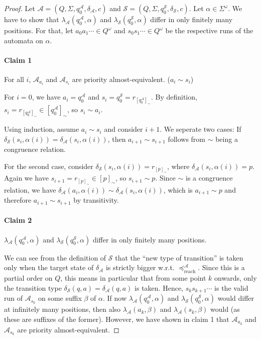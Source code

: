 \begin{proof}
	Let $\mathcal{A} = (Q, \Sigma, q_0^\mathcal{A}, \delta_\mathcal{A}, c)$ and $\mathcal{S} = (Q, \Sigma, q_0^\mathcal{S}, \delta_\mathcal{S}, c)$. Let $\alpha \in \Sigma^\omega$. We have to show that $\lambda_\mathcal{A}(q_0^\mathcal{A}, \alpha)$ and $\lambda_\mathcal{S}(q_0^\mathcal{S}, \alpha)$ differ in only finitely many positions. For that, let $a_0 a_1 \cdots \in Q^\omega$ and $s_0 s_1 \cdots \in Q^\omega$ be the respective runs of the automata on $\alpha$.
	
	\paragraph{Claim 1} For all $i$, $\mathcal{A}_{a_i}$ and $\mathcal{A}_{s_i}$ are priority almost-equivalent. ($a_i \sim s_i$)
	
	For $i = 0$, we have $a_i = q_0^\mathcal{A}$ and $s_i = q_0^\mathcal{S} = r_{[q_0^\mathcal{A}]_\sim}$. By definition, $s_i = r_{[q_0^\mathcal{A}]_\sim} \in [q_0^\mathcal{A}]_\sim$, so $s_i \sim a_i$.
	
	Using induction, assume $a_i \sim s_i$ and consider $i+1$. We seperate two cases: If $\delta_\mathcal{S}(s_i, \alpha(i)) = \delta_\mathcal{A}(s_i, \alpha(i))$, then $a_{i+1} \sim s_{i+1}$ follows from $\sim$ being a congruence relation.
	
	For the second case, consider $\delta_\mathcal{S}(s_i, \alpha(i)) = r_{[p]_\sim}$, where $\delta_\mathcal{A}(s_i, \alpha(i)) = p$. Again we have $s_{i+1} = r_{[p]_\sim} \in [p]_\sim$, so $s_{i+1} \sim p$. Since $\sim$ is a congruence relation, we have $\delta_\mathcal{A}(a_i, \alpha(i)) \sim \delta_\mathcal{A}(s_i, \alpha(i))$, which is $a_{i+1} \sim p$ and therefore $a_{i+1} \sim s_{i+1}$ by transitivity.
	
	\paragraph{Claim 2} $\lambda_\mathcal{A}(q_0^\mathcal{A}, \alpha)$ and $\lambda_\mathcal{S}(q_0^\mathcal{S}, \alpha)$ differ in only finitely many positions.
	
	We can see from the definition of $\mathcal{S}$ that the \enquote{new type of transition} is taken only when the target state of $\delta_\mathcal{A}$ is strictly bigger w.r.t. $\preceq_\text{reach}^\mathcal{A}$. Since this is a partial order on $Q$, this means in particular that from some point $k$ onwards, only the transition type $\delta_\mathcal{S}(q, a) = \delta_\mathcal{A}(q, a)$ is taken. Hence, $s_k s_{k+1} \cdots$ is the valid run of $\mathcal{A}_{s_k}$ on some suffix $\beta$ of $\alpha$. If now $\lambda_\mathcal{A}(q_0^\mathcal{A}, \alpha)$ and $\lambda_\mathcal{S}(q_0^\mathcal{S}, \alpha)$ would differ at infinitely many positions, then also $\lambda_\mathcal{A}(a_k, \beta)$ and $\lambda_\mathcal{A}(s_k, \beta)$ would (as these are suffixes of the former). However, we have shown in claim 1 that $\mathcal{A}_{a_k}$ and $\mathcal{A}_{s_k}$ are priority almost-equivalent.
\end{proof}


